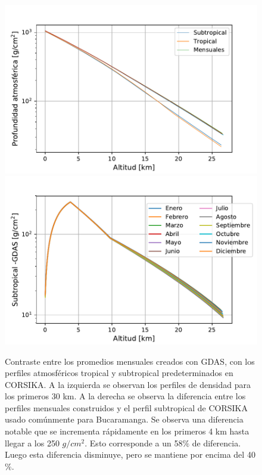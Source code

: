 \begin{figure}[htb!]
\includegraphics[width=0.4\paperwidth]{Figs/perfiles_mensuales.pdf}
\includegraphics[width=0.4\paperwidth]{Figs/diferencias.pdf}
\caption[Promedios mensuales vs perfiles tropical y subtropical de CORSIKA.]{Contraste entre los promedios mensuales creados con GDAS, con los perfiles atmosféricos tropical y subtropical predeterminados en CORSIKA. A la izquierda se observan los perfiles de densidad para los primeros 30 km. A la derecha se observa la diferencia entre los perfiles mensuales construidos y el perfil subtropical de CORSIKA usado comúnmente para Bucaramanga. Se observa una diferencia notable que se incrementa rápidamente en los primeros 4 km hasta llegar a los 250 $g/cm^{2}$. Esto corresponde a un 58$\%$ de diferencia. Luego esta diferencia  disminuye, pero se mantiene por encima del 40$\%$.}
\label{fig:fig16}
\end{figure}

